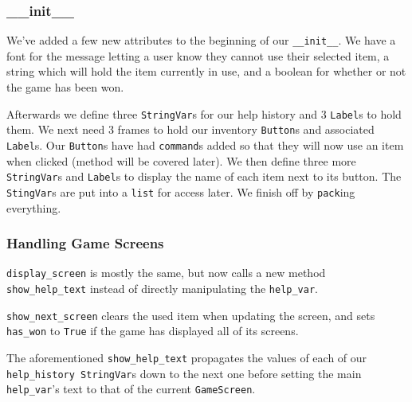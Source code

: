 \documentclass[a4paper,11pt,openany]{book}
\begin{document}
\subsubsection{\_\_init\_\_}

We've added a few new attributes to the beginning of our \lstinline[columns=fixed]{__init__}. We have a font for the message letting a user know they cannot use their selected item, a string which will hold the item currently in use, and a boolean for whether or not the game has been won.

\vspace{5mm}

Afterwards we define three \lstinline[columns=fixed]{StringVar}s for our help history and 3 \lstinline[columns=fixed]{Label}s to hold them. We next need 3 frames to hold our inventory \lstinline[columns=fixed]{Button}s and associated \lstinline[columns=fixed]{Label}s. Our \lstinline[columns=fixed]{Button}s have had \lstinline[columns=fixed]{command}s added so that they will now use an item when clicked (method will be covered later). We then define three more \lstinline[columns=fixed]{StringVar}s and \lstinline[columns=fixed]{Label}s to display the name of each item next to its button. The \lstinline[columns=fixed]{StingVar}s are put into a \lstinline[columns=fixed]{list} for access later. We finish off by \lstinline[columns=fixed]{pack}ing everything. 

\subsubsection{Handling Game Screens}

\lstinline[columns=fixed]{display_screen} is mostly the same, but now calls a new method \lstinline[columns=fixed]{show_help_text} instead of directly manipulating the \lstinline[columns=fixed]{help_var}.

\vspace{5mm}

\lstinline[columns=fixed]{show_next_screen} clears the used item when updating the screen, and sets \lstinline[columns=fixed]{has_won} to \lstinline[columns=fixed]{True} if the game has displayed all of its screens. 

\vspace{5mm}

The aforementioned \lstinline[columns=fixed]{show_help_text} propagates the values of each of our \lstinline[columns=fixed]{help_history StringVar}s down to the next one before setting the main \lstinline[columns=fixed]{help_var}'s text to that of the current \lstinline[columns=fixed]{GameScreen}.
\end{document}
